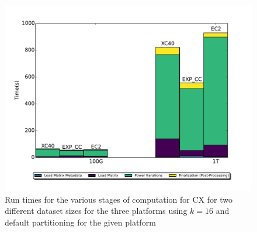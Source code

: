     \begin{figure} [h!btp]
    \begin{centering}
    \includegraphics[scale=0.4]{images/CX_Size_Scaling_New_Colors_Axes_Rank_16_Partitions_default.pdf}
    \end{centering}
    \caption{ Run times for the various stages of computation for CX for two different dataset sizes for the three platforms using $k=16$ and default partitioning for the given platform} 
    \label{fig:h2hrank16} 
    \end{figure}

    
  

  


